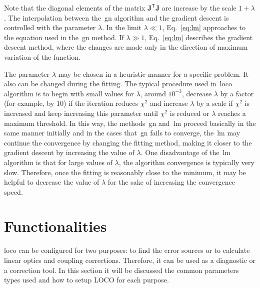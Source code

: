 Note that the diagonal elements of the matrix $\mathbf{J}^{\mathsf{T}}\mathbf{J}$ are increase by the scale $1 + \lambda$. The interpolation between the~\gls{gn} algorithm and the gradient descent is controlled with the parameter $\lambda$. In the limit $\lambda \ll 1$, Eq.~\eqref{eq:lm} approaches to the equation used in the~\gls{gn} method. If $\lambda \gg 1$, Eq.~\eqref{eq:lm} describes the gradient descent method, where the changes are made only in the direction of maximum variation of the function.

The parameter $\lambda$ may be chosen in a heuristic manner for a specific problem. It also can be changed during the fitting. The typical procedure used in~\gls{loco} algorithm \cite{icfa_huang, huang2019beam} is to begin with small values for $\lambda$, around $10^{-3}$, decrease $\lambda$ by a factor (for example, by 10) if the iteration reduces $\chi^2$ and increase $\lambda$ by a scale if $\chi^2$ is increased and keep increasing this parameter until $\chi^2$ is reduced or $\lambda$ reaches a maximum threshold. In this way, the methods~\gls{gn} and~\gls{lm} proceed basically in the same manner initially and in the cases that~\gls{gn} fails to converge, the~\gls{lm} may continue the convergence by changing the fitting method, making it closer to the gradient descent by increasing the value of $\lambda$. One disadvantage of the~\gls{lm} algorithm is that for large values of $\lambda$, the algorithm convergence is typically very slow. Therefore, once the fitting is reasonably close to the minimum, it may be helpful to decrease the value of $\lambda$ for the sake of increasing the convergence speed.
\section{Functionalities}
\gls{loco} can be configured for two purposes: to find the error sources or to calculate linear optics and coupling corrections. Therefore, it can be used as a diagnostic or a correction tool. In this section it will be discussed the common parameters types used and how to setup LOCO for each purpose.
